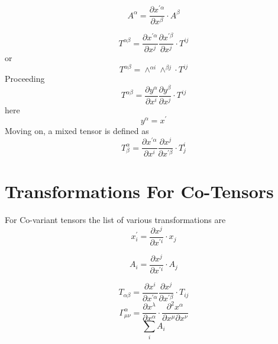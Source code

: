 \documentclass{article}
\begin{document}
\begin{equation}
A^\alpha = \frac{\partial x^{' \alpha}}{\partial x^\beta}\cdot A^\beta 
\end{equation}

\begin{equation}
T^{\alpha \beta}=\frac{\partial x^{' \alpha}}{\partial x^j}\frac{\partial x^{'\beta}}{\partial x^j}\cdot T^{ij} 
\end{equation}
or 
\begin{equation*}
T^{\alpha \beta}=\wedge^{\alpha i}\wedge^{\beta j}\cdot T^{ij}
\end{equation*}
Proceeding
\begin{equation}
T^{\alpha \beta}=\frac{\partial y^{\alpha}}{\partial x^i}\frac{\partial y^{\beta}}{\partial x^j}\cdot T^{ij}
\end{equation}
here
\begin{equation*}
y^{\alpha}=x^{'}
\end{equation*}
Moving on, a mixed tensor is defined as
\begin{equation}
T_{\beta}^{\alpha}=\frac{\partial x^{ ' \alpha}}{\partial x^i} \frac{\partial x^j}{\partial x^{' \beta}}\cdot T_j^{i}
\end{equation}
\section{Transformations For Co-Tensors}
For Co-variant tensors the list of various transformations are 
\begin{equation}
x_i^{'}=\frac{\partial x^j}{\partial x^{'i}}\cdot x_j
\end{equation}

\begin{equation}
A_i=\frac{\partial x^j}{\partial x^{'i}}\cdot A_j
\end{equation}

\begin{equation}
T_{\alpha \beta}=\frac{\partial x^i}{\partial x^{'\alpha}} \frac{\partial x^j}{\partial x^{'\beta}}\cdot T_{ij}
\end{equation}
\begin{equation}
\Gamma_{\mu \nu}^{\alpha}= \frac{\partial x^\lambda}{\partial x^\alpha} \cdot \frac{\partial^2 x^\alpha}{\partial x^\mu \partial x^\nu}
\end{equation}
\begin{equation}
\sum_{i}{A_i}
\end{equation}
\end{document}
